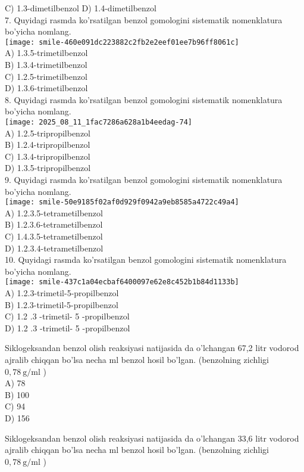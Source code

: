 C) 1.3-dimetilbenzol D) 1.4-dimetilbenzol\\
7. Quyidagi rasmda ko'rsatilgan benzol gomologini sistematik nomenklatura bo'yicha nomlang.\\
\texttt{[image: smile-460e091dc223882c2fb2e2eef01ee7b96ff8061c]}\\
A) 1.3.5-trimetilbenzol\\
B) 1.3.4-trimetilbenzol\\
C) 1.2.5-trimetilbenzol\\
D) 1.3.6-trimetilbenzol\\
8. Quyidagi rasmda ko'rsatilgan benzol gomologini sistematik nomenklatura bo'yicha nomlang.\\
\texttt{[image: 2025\_08\_11\_1fac7286a628a1b4eedag-74]}\\
A) 1.2.5-tripropilbenzol\\
B) 1.2.4-tripropilbenzol\\
C) 1.3.4-tripropilbenzol\\
D) 1.3.5-tripropilbenzol\\
9. Quyidagi rasmda ko'rsatilgan benzol gomologini sistematik nomenklatura bo'yicha nomlang.\\
\texttt{[image: smile-50e9185f02af0d929f0942a9eb8585a4722c49a4]}\\
A) 1.2.3.5-tetrametilbenzol\\
B) 1.2.3.6-tetrametilbenzol\\
C) 1.4.3.5-tetrametilbenzol\\
D) 1.2.3.4-tetrametilbenzol\\
10. Quyidagi rasmda ko'rsatilgan benzol gomologini sistematik nomenklatura bo'yicha nomlang.\\
\texttt{[image: smile-437c1a04ecbaf6400097e62e8c452b1b84d1133b]}\\
A) 1.2.3-trimetil-5-propilbenzol\\
B) 1.2.3-trimetil-5-propilbenzol\\
C) 1.2 .3 -trimetil- 5 -propilbenzol\\
D) 1.2 .3 -trimetil- 5 -propilbenzol
  \item Siklogeksandan benzol olish reaksiyasi natijasida da o'lchangan 67,2 litr vodorod ajralib chiqqan bo'lsa necha ml benzol hosil bo'lgan. (benzolning zichligi $0,78 \mathrm{~g} / \mathrm{ml}$ )\\
A) 78\\
B) 100\\
C) 94\\
D) 156
  \item Siklogeksandan benzol olish reaksiyasi natijasida da o'lchangan 33,6 litr vodorod ajralib chiqqan bo'lsa necha ml benzol hosil bo'lgan. (benzolning zichligi $0,78 \mathrm{~g} / \mathrm{ml}$ )\\
